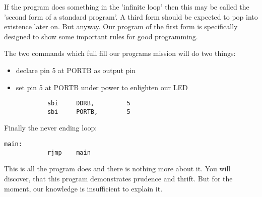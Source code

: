 If the program does something in the 'infinite loop' then this may be called the 'second form of a standard program'. A third form should be expected to pop into existence later on. But anyway. Our program of the first form is specifically designed to show some important rules for good programming.

The two commands which full fill our programs mission will do two things:

\begin{itemize}
  \item  declare pin 5 at PORTB as output pin
  \item  set pin 5 at PORTB under power to enlighten our LED
\end{itemize}

\begin{lstlisting}
            sbi     DDRB,         5
            sbi     PORTB,        5
\end{lstlisting}

Finally the never ending loop:

\begin{lstlisting}
main:
            rjmp    main
\end{lstlisting}

This is all the program does and there is nothing more about it. You will discover, that this program demonstrates prudence and thrift. But for the moment, our knowledge is insufficient to explain it.


